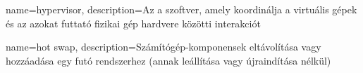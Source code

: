 
{
	name=hypervisor,
	description={Az a szoftver, amely koordinálja a virtuális gépek és az azokat futtató fizikai gép hardvere közötti interakciót}
}

{
	name={hot swap},
	description={Számítógép-komponensek eltávolítása vagy hozzáadása egy futó rendszerhez (annak leállítása vagy újraindítása nélkül)}
}